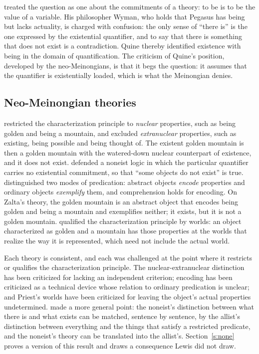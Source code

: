\documentclass{situationist-preprint}
\begin{document}
\citet{Quine1948} treated the question as one about the commitments of a theory: to be is to be the value of a variable. His philosopher Wyman, who holds that Pegasus has being but lacks actuality, is charged with confusion: the only sense of \enquote{there is} is the one expressed by the existential quantifier, and to say that there is something that does not exist is a contradiction. Quine thereby identified existence with being in the domain of quantification. The criticism of Quine's position, developed by the neo-Meinongians, is that it begs the question: it assumes that the quantifier is existentially loaded, which is what the Meinongian denies.

\subsection{Neo-Meinongian theories}

\citet{Parsons1980} restricted the characterization principle to \emph{nuclear} properties, such as being golden and being a mountain, and excluded \emph{extranuclear} properties, such as existing, being possible and being thought of. The existent golden mountain is then a golden mountain with the watered-down nuclear counterpart of existence, and it does not exist. \citet{Routley1980} defended a noneist logic in which the particular quantifier carries no existential commitment, so that \enquote{some objects do not exist} is true. \citet{Zalta1983} distinguished two modes of predication: abstract objects \emph{encode} properties and ordinary objects \emph{exemplify} them, and comprehension holds for encoding. On Zalta's theory, the golden mountain is an abstract object that encodes being golden and being a mountain and exemplifies neither; it exists, but it is not a golden mountain. \citet{Priest2005} qualified the characterization principle by worlds: an object characterized as golden and a mountain has those properties at the worlds that realize the way it is represented, which need not include the actual world.

Each theory is consistent, and each was challenged at the point where it restricts or qualifies the characterization principle. The nuclear-extranuclear distinction has been criticized for lacking an independent criterion; encoding has been criticized as a technical device whose relation to ordinary predication is unclear; and Priest's worlds have been criticized for leaving the object's actual properties undetermined. \citet{Lewis1990} made a more general point: the noneist's distinction between what there is and what exists can be matched, sentence by sentence, by the allist's distinction between everything and the things that satisfy a restricted predicate, and the noneist's theory can be translated into the allist's. Section~\ref{s:none} proves a version of this result and draws a consequence Lewis did not draw.
\end{document}
